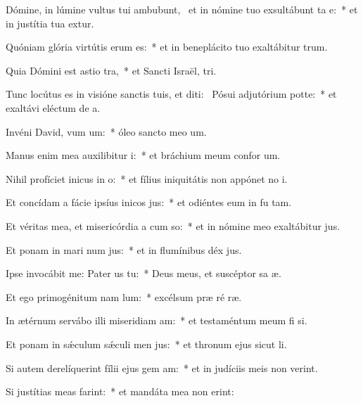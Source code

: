 \item Dómine, in lúmine vultus tui ambubunt,~\pscross{} et in nómine tuo exsultábunt ta e:~* et in justítia tua extur.
\item Quóniam glória virtútis erum  es:~* et in beneplácito tuo exaltábitur  trum.
\item Quia Dómini est astio tra,~* et Sancti Israël,  tri.
\item Tunc locútus es in visióne sanctis tuis, et diti:~\pscross{} Pósui adjutórium  potte:~* et exaltávi eléctum de  a.
\item Invéni David, vum um:~* óleo sancto meo  um.
\item Manus enim mea auxilibitur i:~* et bráchium meum confor um.
\item Nihil profíciet inicus in o:~* et fílius iniquitátis non appónet no i.
\item Et concídam a fácie ipsíus inicos jus:~* et odiéntes eum in fu tam.
\item Et véritas mea, et misericórdia a cum so:~* et in nómine meo exaltábitur  jus.
\item Et ponam in mari num jus:~* et in flumínibus déx jus.
\item Ipse invocábit me: Pater us  tu:~* Deus meus, et suscéptor sa æ.
\item Et ego primogénitum nam lum:~* excélsum præ ré ræ.
\item In ætérnum servábo illi miseridiam am:~* et testaméntum meum fi si.
\item Et ponam in sǽculum sǽculi men jus:~* et thronum ejus sicut  li.
\item Si autem derelíquerint fílii ejus gem am:~* et in judíciis meis non verint.
\item Si justítias meas farint:~* et mandáta mea non erint:
